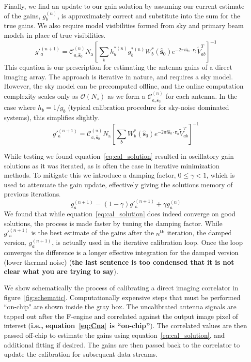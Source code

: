 \documentclass[a4paper,fleqn,usenatbib]{../mnras}
\newcommand{\Nant}{\ensuremath{N_{\mathrm{a}}}}
\newcommand{\spix}{\ensuremath{\hat{\mathbf{s}}_{0}}}
\newcommand{\Cna}[1][n]{\ensuremath{\mathcal{C}^{(#1)}_{a,\spix}}}
\newcommand{\rb}{\ensuremath{\mathbf{r}_b}}
\newcommand{\beamtheta}{\ensuremath{W}}
\newcommand{\V}{\ensuremath{\widetilde{V}}}
\newcommand{\damp}{\ensuremath{\gamma}}
\begin{document}
Finally, we find an update to our gain solution by assuming our current estimate of the gains, $g^{(n)}_b$, is approximately correct and substitute into the sum for the true gains. We also require model visibilities formed from sky and primary beam models in place of true visibilities.
\begin{equation}\label{eq:cal_solution}
g'^{(n+1)}_a = \Cna \Nant \left[ \sum_b h^{*(n)}_b g^{*(n)}_b \beamtheta^*_b(\spix) e^{-2\pi i \spix \cdot \rb} \V^T_{ab} \right]^{-1}
\end{equation}
This equation is our prescription for estimating the antenna gains of a direct imaging array. The approach is iterative in nature, and requires a sky model. However, the sky model can be precomputed offline, and the online computation complexity scales only as $\mathcal{O}(\Nant)$ as we form a $\Cna$ for each antenna. In the case where $h_b = 1/g_b$ (typical calibration procedure for sky-noise dominated systems), this simplifies slightly.
\begin{equation}\label{eq:cal_solution_simple}
g'^{(n+1)}_a = \Cna \Nant \left[ \sum_b \beamtheta^*_b(\spix) e^{-2\pi i \spix \cdot \rb} \V^T_{ab} \right]^{-1}
\end{equation}

While testing we found equation~\ref{eq:cal_solution} resulted in oscillatory gain solutions as it was iterated, as is often the case in iterative minimization methods. To mitigate this we introduce a damping factor, $0 \leq \damp <1$, which is used to attenuate the gain update, effectively giving the solutions memory of previous iterations.
\begin{equation}
g^{(n+1)}_a = (1-\damp) g'^{(n+1)}_a + \damp g^{(n)}_a
\end{equation}
We found that while equation~\ref{eq:cal_solution} does indeed converge on good solutions, the process is made faster by tuning the damping factor. While $g'^{(n+1)}_a$ is the best estimate of the gains after the $n^{\textrm{th}}$ iteration, the damped version, $g^{(n+1)}_a$, is actually used in the iterative calibration loop. Once the loop converges the difference is a longer effective integration for the damped version (lower thermal noise) ({\bf the last sentence is too condensed that it is not clear what you are trying to say}). 

We show schematically the process of calibrating a direct imaging correlator in figure~\ref{fig:schematic}. Computationally expensive steps that must be performed ``on-chip" are shown inside the gray box. The uncalibrated antenna signals are tapped out after the F-engine and correlated against the output image pixel of interest ({\bf i.e., equation~\ref{eq:Cna} is ``on-chip''}). The correlated values are then passed off-chip to estimate the gains using equation~\ref{eq:cal_solution}, and additional fitting if desired. The gains are then passed back to the correlator to update the calibration for subsequent data streams. 
\end{document}

